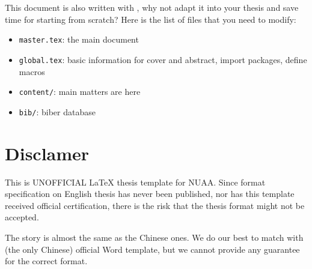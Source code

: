 This document is also written with \nuaathesis,
why not adapt it into your thesis and save time for starting from scratch?
Here is the list of files that you need to modify:
\begin{itemize}
  \item \verb|master.tex|: the main document
  \item \verb|global.tex|: basic information for cover and abstract, import packages, define macros
  \item \verb|content/|: main matters are here
  \item \verb|bib/|: biber database
\end{itemize}

\section{Disclamer}

This is UNOFFICIAL \LaTeX{} thesis template for NUAA.
Since format specification on English thesis has never been published,
nor has this template received official certification,
there is the risk that the thesis format might not be accepted.

The story is almost the same as the Chinese ones.
We do our best to match \nuaathesis{} with (the only Chinese) official Word template,
but we cannot provide any guarantee for the correct format.
